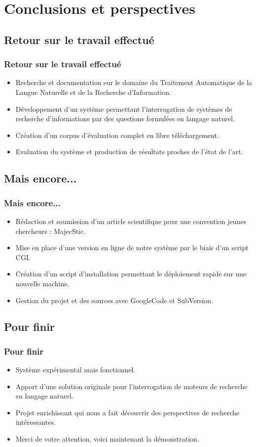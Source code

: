 \documentclass[xcolor=dvipsnames]{beamer}
\begin{document}
\section{Conclusions et perspectives}
\subsection{Retour sur le travail effectué}
\frame
{
  \frametitle{Retour sur le travail effectué}
  \begin{itemize}
    \item<1-> Recherche et documentation sur le domaine du Traitement Automatique de la Langue Naturelle et de la Recherche d'Information.
    \item<2-> Développement d'un système permettant l'interrogation de systèmes de recherche d'informations par des questions formulées en langage naturel.
    \item<3-> Création d'un corpus d'évaluation complet en libre téléchargement.
    \item<4-> Evaluation du système et production de résultats proches de l'état de l'art.
  \end{itemize}
}
\subsection{Mais encore...}
\frame
{
  \frametitle{Mais encore...}
  \begin{itemize}
    \item<1-> Rédaction et soumission d'un article scientifique pour une convention jeunes chercheurs : MajecStic.
    \item<2-> Mise en place d'une version en ligne de notre système par le biais d'un script CGI.
    \item<3-> Création d'un script d'installation permettant le déploiement rapide sur une nouvelle machine.
    \item<4-> Gestion du projet et des sources avec GoogleCode et SubVersion.
  \end{itemize}
}
\subsection{Pour finir}
\frame
{
  \frametitle{Pour finir} 
  \begin{itemize}
      \item<1-> Système expérimental mais fonctionnel.
      \item<2-> Apport d'une solution originale pour l'interrogation de moteurs de recherche en langage naturel.
      \item<3-> Projet enrichissant qui nous a fait découvrir des perspectives de recherche intéressantes.
      \item<4-> Merci de votre attention, voici maintenant la démonstration.
  \end{itemize}
}
\end{document}
